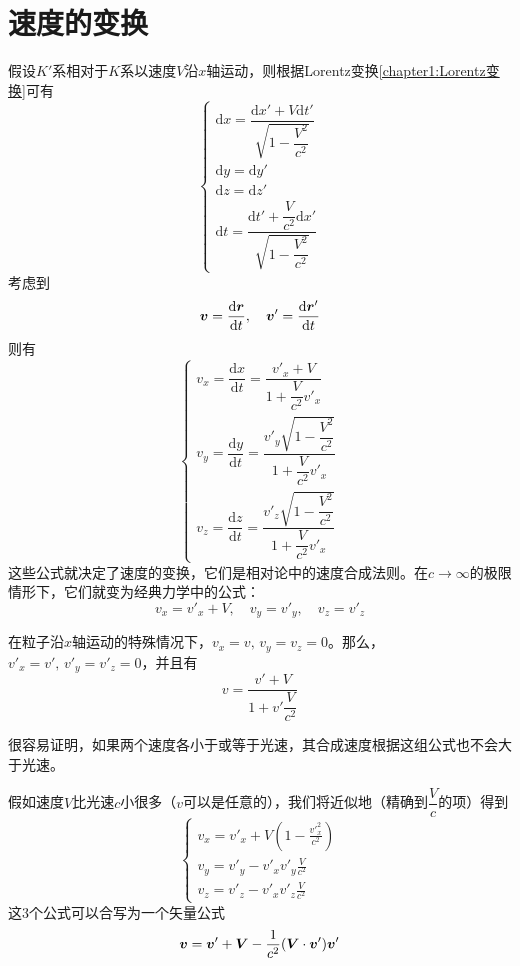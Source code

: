 \section{速度的变换}

假设$K'$系相对于$K$系以速度$V$沿$x$轴运动，则根据Lorentz变换\eqref{chapter1:Lorentz变换}可有
\begin{equation*}
\begin{cases}
	\mathrm{d} x = \dfrac{\mathrm{d}x'+V\mathrm{d}t'}{\sqrt{1-\dfrac{V^2}{c^2}}} \\
	\mathrm{d} y = \mathrm{d} y' \\
	\mathrm{d} z = \mathrm{d} z' \\
	\mathrm{d} t = \dfrac{\mathrm{d}t'+\dfrac{V}{c^2} \mathrm{d}x'}{\sqrt{1-\dfrac{V^2}{c^2}}}
\end{cases}
\end{equation*}
考虑到
\begin{equation*}
	\boldsymbol{v} = \frac{\mathrm{d} \boldsymbol{r}}{\mathrm{d} t},\quad \boldsymbol{v}' = \frac{\mathrm{d} \boldsymbol{r}'}{\mathrm{d} t}
\end{equation*}
则有
\begin{equation}
\begin{cases}
	v_x = \dfrac{\mathrm{d}x}{\mathrm{d}t} = \dfrac{v'_x+V}{1+\dfrac{V}{c^2}v'_x} \\[1.5ex]
	v_y = \dfrac{\mathrm{d}y}{\mathrm{d}t} = \dfrac{v'_y\sqrt{1-\dfrac{V^2}{c^2}}}{1+\dfrac{V}{c^2}v'_x} \\[1.5ex]
	v_z = \dfrac{\mathrm{d}z}{\mathrm{d}t} = \dfrac{v'_z\sqrt{1-\dfrac{V^2}{c^2}}}{1+\dfrac{V}{c^2}v'_x}
\end{cases}
\label{chapter1:速度的变换关系}
\end{equation}
这些公式就决定了速度的变换，它们是相对论中的速度合成法则。在$c\to\infty$的极限情形下，它们就变为经典力学中的公式：
\begin{equation*}
	v_x = v'_x+V,\quad v_y = v'_y,\quad v_z = v'_z
\end{equation*}

在粒子沿$x$轴运动的特殊情况下，$v_x=v,\,v_y=v_z=0$。那么，$v'_x=v',\,v'_y=v'_z=0$，并且有
\begin{equation}
	v = \frac{v'+V}{1+v'\dfrac{V}{c^2}}
\end{equation}

很容易证明，如果两个速度各小于或等于光速，其合成速度根据这组公式也不会大于光速。

假如速度$V$比光速$c$小很多（$v$可以是任意的），我们将近似地（精确到$\dfrac{V}{c}$的项）得到
\begin{equation}
\begin{cases}
	\displaystyle v_x = v'_x+V\left(1-\frac{v'^2_x}{c^2}\right) \\[1.5ex]
	\displaystyle v_y = v'_y-v'_xv'_y\frac{V}{c^2} \\[1.5ex]
	\displaystyle v_z = v'_z-v'_xv'_z\frac{V}{c^2}
\end{cases}
\end{equation}
这3个公式可以合写为一个矢量公式
\begin{equation}
	\boldsymbol{v} = \boldsymbol{v}' + \boldsymbol{V} - \frac{1}{c^2}(\boldsymbol{V}\cdot \boldsymbol{v}') \boldsymbol{v}'
\end{equation}

